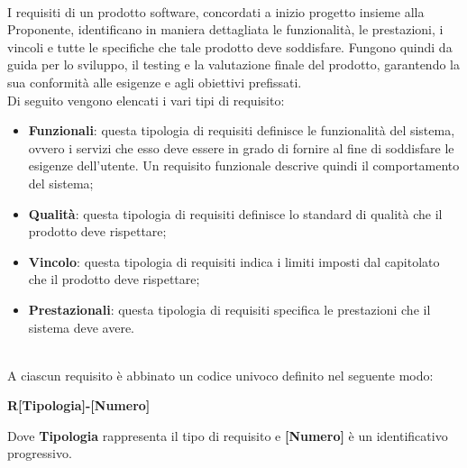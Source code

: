  \\
I requisiti di un prodotto software, concordati a inizio progetto insieme alla Proponente, identificano in maniera dettagliata le funzionalità, le prestazioni, i vincoli e tutte le specifiche che tale prodotto deve soddisfare. Fungono quindi da guida per lo sviluppo, il testing e la valutazione finale del prodotto, garantendo la sua conformità alle esigenze e agli obiettivi prefissati.\\
Di seguito vengono elencati i vari tipi di requisito:\\
\begin{itemize} 
    \item \textbf{Funzionali}: questa tipologia di requisiti definisce le funzionalità del sistema, ovvero i servizi che esso deve essere in grado di fornire al fine di soddisfare le esigenze dell'utente. Un requisito funzionale descrive quindi il comportamento del sistema;
    \item \textbf{Qualità}: questa tipologia di requisiti definisce lo standard di qualità che il prodotto deve rispettare;
    \item \textbf{Vincolo}: questa tipologia di requisiti indica i limiti imposti dal capitolato che il prodotto deve rispettare;
    \item \textbf{Prestazionali}: questa tipologia di requisiti specifica le prestazioni che il sistema deve avere. 
\end{itemize}

\\
A ciascun requisito è abbinato un codice univoco definito nel seguente modo:
\begin{center}
    \textbf{R[Tipologia]-[Numero]}
\end{center}
Dove \textbf{Tipologia} rappresenta il tipo di requisito e \textbf{[Numero]} è un identificativo progressivo.
